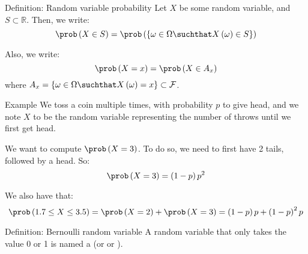 \documentclass[a4paper]{article}
\begin{document}
\begin{parag}{Definition: Random variable probability}
    Let $X$ be some random variable, and $S \subset \mathbb{R}$. Then, we write: 
    \[\prob\left(X \in S\right) = \prob\left(\left\{\omega \in \Omega \suchthat X\left(\omega\right) \in S\right\}\right)\]
    
    Also, we write: 
    \[\prob\left(X = x\right) = \prob\left(X \in A_x\right)\]
    where $A_x = \left\{\omega \in \Omega \suchthat X\left(\omega\right) = x\right\} \subset \mathcal{F}$.
\end{parag}

\begin{parag}{Example}
    We toss a coin multiple times, with probability $p$ to give head, and we note $X$ to be the random variable representing the number of throws until we first get head.

    We want to compute $\prob\left(X = 3\right)$. To do so, we need to first have 2 tails, followed by a head. So: 
    \[\prob\left(X = 3\right) = \left(1-p\right)p^2\]
    
    We also have that: 
    \[\prob\left(1.7 \leq X \leq 3.5\right) = \prob\left(X = 2\right) + \prob\left(X=3\right) = \left(1-p\right)p + \left(1-p\right)^2 p\]
\end{parag}

\begin{parag}{Definition: Bernoulli random variable}
    A random variable that only takes the value 0 or 1 is named a  (or  or ).
\end{parag}
\end{document}

